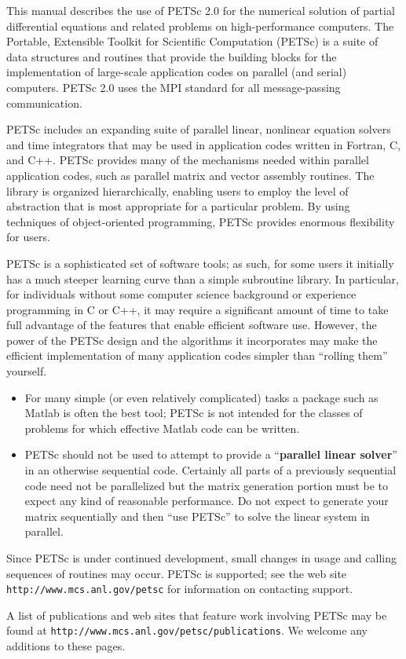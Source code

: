 
%
%

\medskip \medskip
This manual describes the use of PETSc 2.0 for the numerical solution
of partial differential equations and related problems 
on high-performance computers.  The
Portable, Extensible Toolkit for Scientific Computation (PETSc) is a
suite of data structures and routines that provide the building
blocks for the implementation of large-scale application codes on parallel
(and serial) computers.  PETSc 2.0 uses the MPI standard for all
message-passing communication.

PETSc includes an expanding suite of parallel linear, nonlinear
equation solvers and time integrators that may be
used in application codes written in Fortran, C, and C++.  PETSc
provides many of the mechanisms needed within parallel application
codes, such as parallel matrix and vector assembly routines. The library is
organized hierarchically, enabling users to employ the level of
abstraction that is most appropriate for a particular problem. By
using techniques of object-oriented programming, PETSc provides
enormous flexibility for users.

PETSc is a sophisticated set of software tools; as such, for some
users it initially has a much steeper learning curve than a simple
subroutine library. In particular, for individuals without some
computer science background or experience programming in C or C++, it
may require a significant amount of time to take full advantage of the
features that enable efficient software use.  However, the power of
the PETSc design and the algorithms it incorporates may make the efficient
implementation of many application codes simpler than ``rolling
them'' yourself.
\begin{itemize}
\item  For many simple (or even relatively complicated)
tasks a package such as Matlab is often the best tool; PETSc is not
intended for the classes of problems for which effective Matlab code
can be written.
\item PETSc should not be used to attempt to provide
a ``{\bf parallel linear solver}'' in an otherwise sequential code.
Certainly all parts of a previously sequential code need not be parallelized but the 
matrix generation portion must be to expect any kind of reasonable performance.
Do not expect to generate your matrix sequentially and then ``use PETSc'' to solve
the linear system in parallel.
\end{itemize}

Since PETSc is under continued development, small changes in usage and
calling sequences of routines may occur.  PETSc is supported; see the
web site {\tt http://www.mcs.anl.gov/petsc} for information on
contacting support.

A list of publications and web sites that feature work involving PETSc may be found
at {\tt http://www.mcs.anl.gov/petsc/publications}. We welcome any additions to these
pages.

\medskip \medskip



